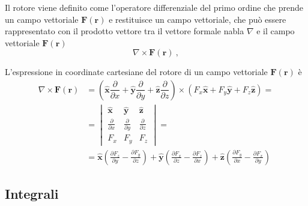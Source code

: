 \begin{definition}[Rotore] Il rotore viene definito come l'operatore differenziale del primo ordine che prende un campo vettoriale $\mathbf{F}(\mathbf{r})$ e restituisce un campo vettoriale, che può essere rappresentato con il prodotto vettore tra il vettore formale nabla $\nabla$ e il campo vettoriale $\mathbf{F}(\mathbf{r})$
    \begin{equation}
        \nabla \times \mathbf{F}(\mathbf{r}) \ ,
    \end{equation}
\end{definition}
\begin{property}
L'espressione in coordinate cartesiane del rotore di un campo vettoriale $\mathbf{F}(\mathbf{r})$ è
    \begin{equation}
        \begin{aligned}
            \nabla \times \mathbf{F}(\mathbf{r}) & = \left( \mathbf{\hat{x}} \dfrac{\partial}{\partial x} + \mathbf{\hat{y}} \dfrac{\partial}{\partial y} + \mathbf{\hat{z}} \dfrac{\partial}{\partial z} \right) \times (F_x \mathbf{\hat{x}} + F_y \mathbf{\hat{y}} + F_z \mathbf{\hat{z}} ) = \\
            & = \begin{vmatrix} \mathbf{\hat{x}} & \mathbf{\hat{y}} & \mathbf{\hat{z}} \\
            \frac{\partial}{\partial x} & \frac{\partial}{\partial y} & \frac{\partial}{\partial z} \\
            F_x & F_y & F_z \end{vmatrix} = \\
            & = \mathbf{\hat{x}} \left( \frac{\partial F_z}{\partial y} - \frac{\partial F_y}{\partial z} \right) +  
                \mathbf{\hat{y}} \left( \frac{\partial F_x}{\partial z} - \frac{\partial F_z}{\partial x} \right) +  
                \mathbf{\hat{z}} \left( \frac{\partial F_y}{\partial x} - \frac{\partial F_x}{\partial y} \right)    
        \end{aligned}
    \end{equation}
\end{property}
\begin{property}
\end{property}

\subsection{Integrali}
